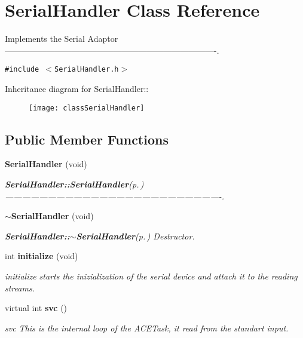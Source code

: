 \section{Serial\-Handler Class Reference}
\label{classSerialHandler}
Implements the Serial Adaptor ----------------------------------------------------------------------------.  


{\tt \#include $<$Serial\-Handler.h$>$}

Inheritance diagram for Serial\-Handler::\begin{figure}[H]
\begin{center}
\leavevmode
\texttt{[image: classSerialHandler]}
\end{center}
\end{figure}
\subsection*{Public Member Functions}
\begin{CompactItemize}
\item 
{\bf Serial\-Handler} (void)
\begin{CompactList}\small\item\em {\bf Serial\-Handler::Serial\-Handler}{\rm (p.\,\pageref{classSerialHandler_a0})} ----------------------------------------------------------------------------. \item\end{CompactList}\item 
{\bf $\sim$Serial\-Handler} (void)
\begin{CompactList}\small\item\em {\bf Serial\-Handler::$\sim$Serial\-Handler}{\rm (p.\,\pageref{classSerialHandler_a1})} Destructor. \item\end{CompactList}\item 
int {\bf initialize} (void)
\begin{CompactList}\small\item\em initialize starts the inizialization of the serial device and attach it to the reading streams. \item\end{CompactList}\item 
virtual int {\bf svc} ()
\begin{CompactList}\small\item\em svc This is the internal loop of the ACETask, it read from the standart input. \item\end{CompactList}\end{CompactItemize}
